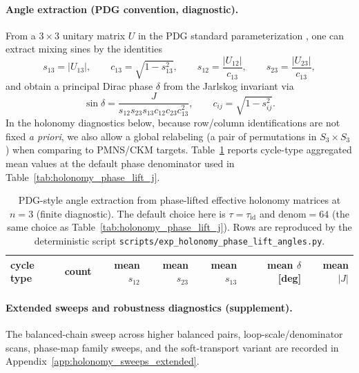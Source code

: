 \paragraph{Angle extraction (PDG convention, diagnostic).}
From a $3\times 3$ unitary matrix $U$ in the PDG standard parameterization \cite{PDGRPP2024}, one can extract mixing sines by the identities
\[
s_{13}=|U_{13}|,\qquad
c_{13}=\sqrt{1-s_{13}^2},\qquad
s_{12}=\frac{|U_{12}|}{c_{13}},\qquad
s_{23}=\frac{|U_{23}|}{c_{13}},
\]
and obtain a principal Dirac phase $\delta$ from the Jarlskog invariant via
\[
\sin\delta=\frac{J}{s_{12}s_{23}s_{13}c_{12}c_{23}c_{13}^2},
\qquad
c_{ij}=\sqrt{1-s_{ij}^2}.
\]
In the holonomy diagnostics below, because row/column identifications are not fixed \emph{a priori}, we also allow a global relabeling (a pair of permutations in $S_3\times S_3$) when comparing to PMNS/CKM targets.
Table~\ref{tab:holonomy_phase_lift_angles} reports cycle-type aggregated mean values at the default phase denominator used in Table~\ref{tab:holonomy_phase_lift_j}.

\begin{table}[t]
\centering
\small
\setlength{\tabcolsep}{10pt}
\renewcommand{\arraystretch}{1.15}
\begin{tabular}{lrrrrrr}
\toprule
cycle type & count & mean $s_{12}$ & mean $s_{23}$ & mean $s_{13}$ & mean $\delta$ [deg] & mean $|J|$ \\
\midrule
%
\end{tabular}
\caption{PDG-style angle extraction from phase-lifted effective holonomy matrices at $n=3$ (finite diagnostic). The default choice here is $\tau=\tau_{\mathrm{id}}$ and $\mathrm{denom}=64$ (the same choice as Table~\ref{tab:holonomy_phase_lift_j}). Rows are reproduced by the deterministic script \texttt{scripts/exp\_holonomy\_phase\_lift\_angles.py}.}
\label{tab:holonomy_phase_lift_angles}
\end{table}

\paragraph{Extended sweeps and robustness diagnostics (supplement).}
The balanced-chain sweep across higher balanced pairs, loop-scale/denominator scans, phase-map family sweeps, and the soft-transport variant are recorded in Appendix~\ref{app:holonomy_sweeps_extended}.